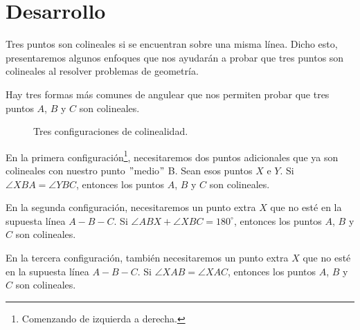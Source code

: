 \section{Desarrollo}

\begin{figure}[htb]
    \centering
\end{figure}

Tres puntos son colineales si se encuentran sobre una misma línea.
Dicho esto, presentaremos algunos enfoques que nos ayudarán a probar que tres puntos son colineales al resolver problemas de geometría.

Hay tres formas más comunes de angulear que nos permiten probar que tres puntos $A$, $B$ y $C$ son colineales.

\begin{figure}[htb]
    \centering
    \caption{Tres configuraciones de colinealidad.}
\end{figure}

En la primera configuración\footnote{Comenzando de izquierda a derecha.}, necesitaremos dos puntos adicionales que ya son colineales con nuestro punto \("\)medio\("\) B.
Sean esos puntos $X$ e $Y$.
Si $\angle XBA = \angle YBC$, entonces los puntos $A$, $B$ y $C$ son colineales.

En la segunda configuración, necesitaremos un punto extra $X$ que no esté en la supuesta línea $A - B - C$.
Si $\angle ABX + \angle XBC = 180^\circ$, entonces los puntos $A$, $B$ y $C$ son colineales.

En la tercera configuración, también necesitaremos un punto extra $X$ que no esté en la supuesta línea $A - B - C$.
Si $\angle XAB = \angle XAC$, entonces los puntos $A$, $B$ y $C$ son colineales.%
